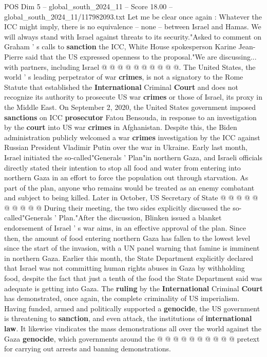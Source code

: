 \begin{textsample}{POS Dim 5 – global\_south\_2024\_11 – Score 18.00 – global\_south\_2024\_11/117982093.txt}
Let me be clear once again : Whatever the ICC might imply, there is no equivalence -- none -- between Israel and Hamas.
We will always stand with Israel against threats to its security."Asked to comment on Graham ' s calls to \textbf{sanction} the ICC, White House spokesperson Karine Jean-Pierre said that the US expressed openness to the proposal."We are discussing... with partners, including Israel @ @ @ @ @ @ @ @ @ @.
The United States, the world ' s leading perpetrator of war \textbf{crimes}, is not a signatory to the Rome Statute that established the \textbf{International} Criminal \textbf{Court} and does not recognize its authority to prosecute US war \textbf{crimes} or those of Israel, its proxy in the Middle East.
On September 2, 2020, the United States government imposed \textbf{sanctions} on ICC \textbf{prosecutor} Fatou Bensouda, in response to an investigation by the \textbf{court} into US war \textbf{crimes} in Afghanistan.
Despite this, the Biden administration publicly welcomed a war \textbf{crimes} investigation by the ICC against Russian President Vladimir Putin over the war in Ukraine.
Early last month, Israel initiated the so-called"Generals ' Plan"in northern Gaza, and Israeli officials directly stated their intention to stop all food and water from entering into northern Gaza in an effort to force the population out through starvation.
As part of the plan, anyone who remains would be treated as an enemy combatant and subject to being killed.
Later in October, US Secretary of State @ @ @ @ @ @ @ @ @ @ During their meeting, the two sides explicitly discussed the so-called"Generals ' Plan."After the discussion, Blinken issued a blanket endorsement of Israel ' s war aims, in an effective approval of the plan.
Since then, the amount of food entering northern Gaza has fallen to the lowest level since the start of the invasion, with a UN panel warning that famine is imminent in northern Gaza.
Earlier this month, the State Department explicitly declared that Israel was not committing human rights abuses in Gaza by withholding food, despite the fact that just a tenth of the food the State Department said was adequate is getting into Gaza.
The \textbf{ruling} by the \textbf{International} Criminal \textbf{Court} has demonstrated, once again, the complete criminality of US imperialism.
Having funded, armed and politically supported a \textbf{genocide}, the US government is threatening to \textbf{sanction}, and even attack, the institutions of \textbf{international} \textbf{law}.
It likewise vindicates the mass demonstrations all over the world against the Gaza \textbf{genocide}, which governments around the @ @ @ @ @ @ @ @ @ @ pretext for carrying out arrests and banning demonstrations.

\end{textsample}
